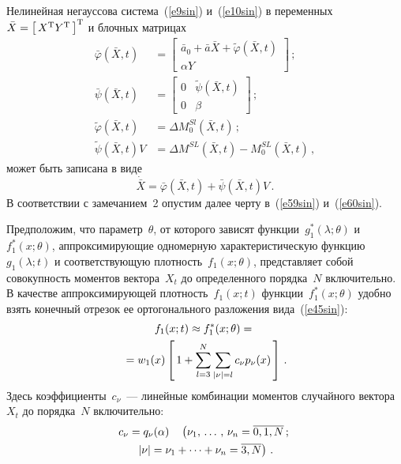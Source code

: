 \begin{multicols}{2}
Нелинейная негауссова система~(\ref{e9sin}) и~(\ref{e10sin}) в переменных $\bar X=
\left[\, X^{\mathrm{T}} Y^{\mathrm{T}}\,\right]^{\mathrm{T}}$ и блочных матрицах
\begin{align*}
\bar \varphi (\bar X,t)& =
\begin{bmatrix}
    \bar a_0 +\bar a \bar X +\tilde\varphi (\bar X,t)\\
    \alpha Y
    \end{bmatrix}\,;\\[3pt]
    \bar \psi (\bar X, t)& =
    \begin{bmatrix}
    0&\tilde\psi (\bar X,t)\\
    0&\beta
    \end{bmatrix}\,;\\[3pt]
\tilde \varphi(\bar X, t) &= \Delta M_0^{Sl} (\bar X,t)\,;\\[3pt]
\tilde \psi (\bar X,t) V&= \Delta M^{SL} (\bar X,t) - M_0^{SL} (\bar X,t)\,,
    \end{align*}
может быть записана в виде
\begin{equation}
{\dot{\bar X}} =\bar \varphi (\bar X,t) +\bar\psi (\bar X,t)V\,.
\label{e58sin}
\end{equation}
В соответствии с замечанием~2 опустим далее черту в~(\ref{e59sin}) и~(\ref{e60sin}).

Предположим, что параметр~$\theta$, от которого зависят функции~$g_1^*(\lambda;\theta)$ и
$f_1^*(x;\theta)$, аппроксимирующие
одномерную характеристическую функцию~$g_1 (\lambda;t)$ и
соответствующую плотность~$f_1(x;\theta)$, представляет собой
совокупность моментов вектора~$X_t$ до определенного порядка~$N$
включительно. В качестве аппроксимирующей плотность~$f_1 (x;t)$
функции~$f_1^*(x;\theta)$ удобно взять конечный отрезок ее
ортогонального разложения вида~(\ref{e45sin}):
\begin{multline}
f_1 (x;t) \approx f_1^*(x;\theta) ={}\\
{}= w_1 (x) \left[\, 1+\sum\limits_{l=3}^N
    \sum\limits_{\vert \nu\vert=l} c_\nu p_\nu (x)\,\right]\,.
    \label{e59sin}
    \end{multline}
Здесь коэффициенты~$c_\nu$~---  линейные комбинации моментов
случайного вектора~$X_t$ до порядка~$N$ включительно:
\begin{multline}
c_\nu = q_\nu (\alpha) \quad \left(\nu_1,\,\ldots\,,\, \nu_n =\overline{0,1, N}\,;\right.\\
\left. \vert \nu\vert
    =\nu_1 +\cdots+\nu_n =\overline{3, N}\right )\,.
    \label{e60sin}
    \end{multline}


\end{multicols}
